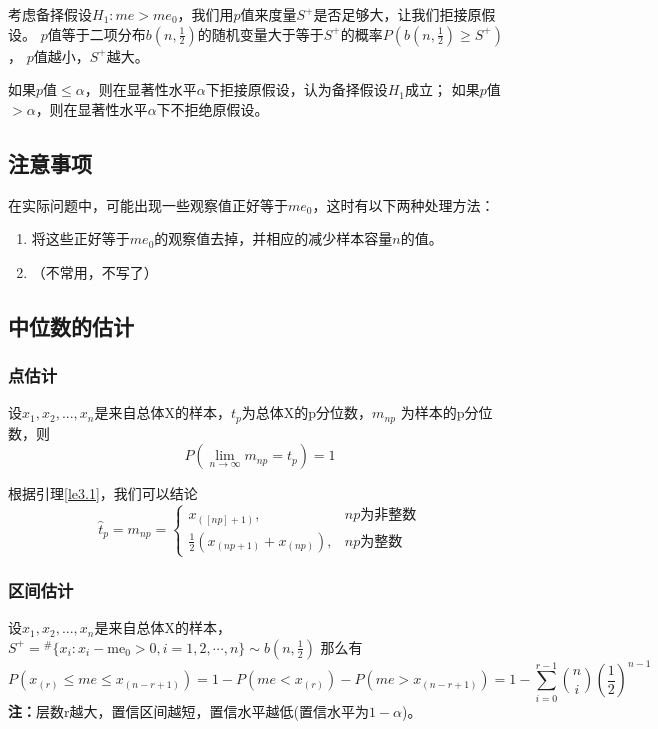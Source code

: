 \documentclass[lang=cn,10pt]{elegantbook}
\begin{document}
考虑备择假设$H_1:me>me_0$，我们用$p$值来度量$S^+$是否足够大，让我们拒接原假设。
$p$值等于二项分布$b(n,\frac12)$的随机变量大于等于$S^+$的概率$P(b(n,\frac12)\geq S^+)$，
$p$值越小，$S^+$越大。

如果$p$值$\leq \alpha$，则在显著性水平$\alpha$下拒接原假设，认为备择假设$H_1$成立；
如果$p$值$> \alpha$，则在显著性水平$\alpha$下不拒绝原假设。

\subsection{注意事项}
在实际问题中，可能出现一些观察值正好等于$me_0$，这时有以下两种处理方法：
\begin{enumerate}[1、]
    \item 将这些正好等于$me_0$的观察值去掉，并相应的减少样本容量$n$的值。
    \item （不常用，不写了）
\end{enumerate}

\subsection{中位数的估计}
\subsubsection{点估计}
\begin{lemma}\label{le3.1}
    设$x_1,x_2,...,x_n$是来自总体X的样本，$t_p$为总体X的p分位数，$m_{np}$
    为样本的p分位数，则
    \begin{equation}
        P(\lim_{n \to \infty} m_{np} = t_p ) = 1
    \end{equation}
\end{lemma}
根据引理\ref{le3.1}，我们可以结论
\begin{equation}
    \hat{t}_p = m_{np} = \begin{cases}
        x_{([np]+1)},                 & np\text{为非整数} \\
        \frac12(x_{(np+1)}+x_{(np)}), & np\text{为整数}
    \end{cases}
\end{equation}

\subsubsection{区间估计}
设$x_1,x_2,...,x_n$是来自总体X的样本，$S^+ =
    {}^{\#}\{x_i:x_i-\text{me}_0>0,i=1,2,\cdots,n\}\sim b(n,\frac12)$
那么有
\begin{equation}
    P(x_{(r)}\leq me \leq x_{(n-r+1)}) =1-P(me < x_{(r)}) -P(me > x_{(n-r+1)})
    = 1-\sum_{i=0}^{r-1}\binom{n}{i}(\frac{1}{2})^{n-1}
\end{equation}
\textbf{注：}层数r越大，置信区间越短，置信水平越低(置信水平为$1-\alpha$)。
\end{document}
